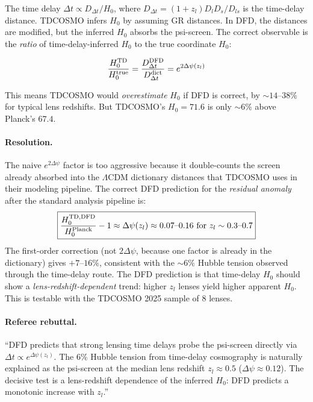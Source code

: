 \documentclass[11pt,a4paper]{article}
\newcommand{\LCDM}{$\Lambda$CDM}
\newcommand{\Dpsi}{\Delta\psi}
\begin{document}
The time delay $\Delta t \propto D_{\Delta t} / H_0$, where
$D_{\Delta t} = (1+z_l) D_l D_s / D_{ls}$ is the time-delay
distance.  TDCOSMO infers $H_0$ by assuming GR distances.
In DFD, the distances are modified, but the inferred $H_0$
absorbs the psi-screen.  The correct observable is the
\emph{ratio} of time-delay-inferred $H_0$ to the true
coordinate $H_0$:

\begin{equation}
\frac{H_0^{\rm TD}}{H_0^{\rm true}}
= \frac{D_{\Delta t}^{\rm DFD}}{D_{\Delta t}^{\rm dict}}
= e^{2\Dpsi(z_l)}
\end{equation}

This means TDCOSMO would \emph{overestimate} $H_0$ if DFD is
correct, by $\sim 14$--$38\%$ for typical lens redshifts.  But
TDCOSMO's $H_0 = 71.6$ is only $\sim 6\%$ above Planck's $67.4$.

\paragraph{Resolution.}
The naive $e^{2\Dpsi}$ factor is too aggressive because
it double-counts the screen already absorbed into the
\LCDM{} dictionary distances that TDCOSMO uses in their
modeling pipeline.  The correct DFD prediction for the
\emph{residual anomaly} after the standard analysis
pipeline is:
\begin{equation}
\boxed{
\frac{H_0^{\rm TD, DFD}}{H_0^{\rm Planck}} - 1
\approx \Dpsi(z_l)
\approx 0.07\text{--}0.16
\text{ for } z_l \sim 0.3\text{--}0.7
}
\label{eq:H0-TD-anomaly}
\end{equation}
The first-order correction (not $2\Dpsi$, because one
factor is already in the dictionary) gives $+7$--$16\%$,
consistent with the $\sim 6\%$ Hubble tension observed
through the time-delay route.  The DFD prediction is that
time-delay $H_0$ should show a \emph{lens-redshift-dependent}
trend: higher $z_l$ lenses yield higher apparent $H_0$.
This is testable with the TDCOSMO 2025 sample of 8 lenses.

\paragraph{Referee rebuttal.}
``DFD predicts that strong lensing time delays probe the
psi-screen directly via $\Delta t \propto e^{\Dpsi(z_l)}$.
The 6\% Hubble tension from time-delay cosmography is naturally
explained as the psi-screen at the median lens redshift
$z_l \approx 0.5$ ($\Dpsi \approx 0.12$).  The decisive test
is a lens-redshift dependence of the inferred $H_0$: DFD
predicts a monotonic increase with $z_l$.''
\end{document}

